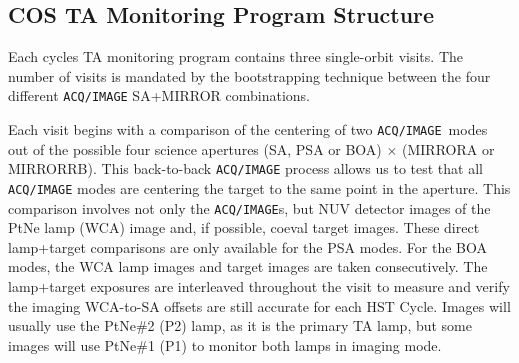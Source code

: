 \subsection{COS TA Monitoring Program Structure}\label{subsec:structure}

Each cycles TA monitoring program contains three single-orbit visits. The number of visits is mandated by the bootstrapping technique between the four different \texttt{ACQ/IMAGE} SA+MIRROR combinations.

Each visit begins with a comparison of the centering of two \texttt{ACQ/IMAGE}~modes out of the possible four science apertures (SA, PSA or BOA) $\times$ (MIRRORA or MIRRORRB).
This back-to-back \texttt{ACQ/IMAGE} process allows us to test that all \texttt{ACQ/IMAGE} modes are centering the target to the same point in the aperture.
This comparison involves not only the \texttt{ACQ/IMAGE}s, but NUV detector images of the PtNe lamp (WCA) image and, if possible, coeval target images.
These direct lamp+target comparisons are only available for the PSA modes. For the BOA modes, the WCA lamp images and target images are taken consecutively.
The lamp+target exposures are interleaved throughout the visit to measure and verify the imaging WCA-to-SA offsets are still accurate for each HST Cycle.
Images will usually use the PtNe\#2 (P2) lamp, as it is the primary TA lamp, but some images will use PtNe\#1 (P1) to monitor both lamps in imaging mode.

